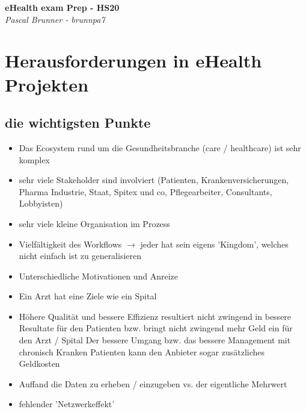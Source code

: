\documentclass{report}
\newenvironment{Figure}
	{\par\medskip\noindent\minipage{\linewidth}}
	{\endminipage\par\medskip}
\theoremstyle{definition}
\theoremstyle{example}
\begin{document}
\begin{titlepage}
   \begin{center}
      \Large\textbf{eHealth exam Prep - HS20}\\
      \large\textit{Pascal Brunner - brunnpa7}
   \end{center}
\end{titlepage}


\tableofcontents

\newpage

\chapter{Herausforderungen in eHealth Projekten}

\section{die wichtigsten Punkte}
\begin{itemize}
   \item Das Ecosystem rund um die Gesundheitsbranche (care / healthcare) ist sehr komplex
   \item sehr viele Stakeholder sind involviert (Patienten, Krankenversicherungen, Pharma Industrie, Staat, Spitex und co, Pflegearbeiter, Consultants, Lobbyisten)
   \item sehr viele kleine Organisation im Prozess
   \item Vielfältigkeit des Workflows $\rightarrow$ jeder hat sein eigens 'Kingdom', welches nicht einfach ist zu generalisieren 
   \item Unterschiedliche Motivationen und Anreize
   \item Ein Arzt hat eine Ziele wie ein Spital
   \item Höhere Qualität und bessere Effizienz resultiert nicht zwingend in bessere Resultate für den Patienten bzw. bringt nicht zwingend mehr Geld ein für den Arzt / Spital
   \subitem Der bessere Umgang bzw. das bessere Management mit chronisch Kranken Patienten kann den Anbieter sogar zusätzliches Geldkosten
   \item Auffand die Daten zu erheben / einzugeben vs. der eigentliche Mehrwert
   \item fehlender 'Netzwerkeffekt'
\end{itemize}
\end{document}
